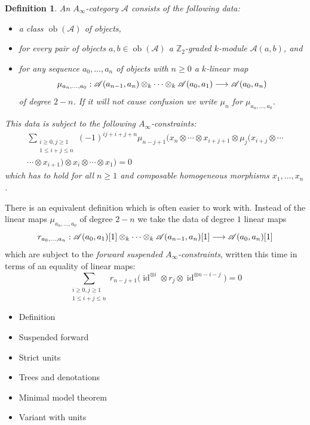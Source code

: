 \documentclass[english,letter paper,12pt,leqno]{article}
\theoremstyle{example}
\newtheorem{definition}[theorem]{Definition}
\numberwithin{equation}{section}
\def\be{\begin{equation}}
\def\ee{\end{equation}}
\begin{document}
\begin{definition} An \emph{$A_\infty$-category} $\mathscr{A}$ consists of the following data:
\begin{itemize}
\item a class $\operatorname{ob}(\mathscr{A})$ of objects,
\item for every pair of objects $a,b \in \operatorname{ob}(\mathscr{A})$ a $\mathbb{Z}_2$-graded $k$-module $\mathscr{A}(a,b)$, and
\item for any sequence $a_0,\ldots,a_n$ of objects with $n \ge 0$ a $k$-linear map
\[
\mu_{a_n,\ldots,a_0}: \mathscr{A}(a_{n-1}, a_n) \otimes_k \cdots \otimes_k \mathscr{A}(a_0, a_1) \longrightarrow \mathscr{A}(a_0,a_n)
\]
of degree $2 - n$. If it will not cause confusion we write $\mu_n$ for $\mu_{a_n,\ldots,a_0}$.
\end{itemize}
This data is subject to the following \emph{$A_\infty$-constraints}:
\begin{align*}
\sum_{\substack{i \ge 0, j \ge 1 \\ 1 \le i + j \le n }} (-1)^{ij + i + j + n} \mu_{n-j+1}\Big( x_n \otimes \cdots \otimes x_{i+j+1} \otimes \mu_j\big( x_{i+j} \otimes \cdots \\
\cdots \otimes x_{i+1} \big) \otimes x_i \otimes \cdots \otimes x_1 \Big) = 0
\end{align*}
which has to hold for all $n \ge 1$ and composable homogeneous morphisms $x_1,\ldots,x_n$.
\end{definition}

There is an equivalent definition which is often easier to work with. Instead of the linear maps $\mu_{a_n,\ldots,a_0}$ of degree $2-n$ we take the data of degree $1$ linear maps
\be
r_{a_0,\ldots,a_n}: \mathscr{A}(a_0,a_1)[1] \otimes_k \cdots \otimes_k \mathscr{A}(a_{n-1},a_n)[1] \lto \mathscr{A}(a_0,a_n)[1]
\ee
which are subject to the \emph{forward suspended $A_\infty$-constraints}, written this time in terms of an equality of linear maps:
\be
\sum_{\substack{i \ge 0, j \ge 1 \\ 1 \le i + j \le n }} r_{n-j+1}\Big( \operatorname{id}^{\otimes i} \otimes r_j \otimes \operatorname{id}^{\otimes n - i - j} \Big) = 0
\ee

\begin{itemize}
\item Definition
\item Suspended forward
\item Strict units
\item Trees and denotations
\item Minimal model theorem
\item Variant with units
\end{itemize}
\end{document}
